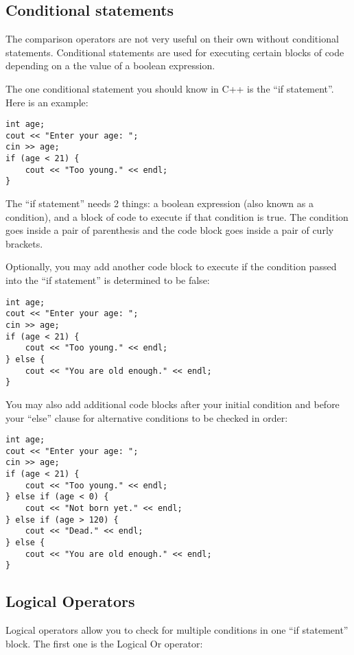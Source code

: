 \documentclass[a4paper,12pt]{article}
\begin{document}
\subsection*{Conditional statements}

The comparison operators are not very useful on their own without conditional statements. Conditional statements are used for executing certain blocks of code depending on a the value of a boolean expression.

The one conditional statement you should know in C++ is the ``if statement''. Here is an example:

\newpage

\begin{lstlisting}
int age;
cout << "Enter your age: ";
cin >> age;
if (age < 21) {
	cout << "Too young." << endl;
}
\end{lstlisting}

The ``if statement'' needs 2 things: a boolean expression (also known as a condition), and a block of code to execute if that condition is true. The condition goes inside a pair of parenthesis and the code block goes inside a pair of curly brackets.

Optionally, you may add another code block to execute if the condition passed into the ``if statement'' is determined to be false:

\begin{lstlisting}
int age;
cout << "Enter your age: ";
cin >> age;
if (age < 21) {
	cout << "Too young." << endl;
} else {
	cout << "You are old enough." << endl;
}
\end{lstlisting}

You may also add additional code blocks after your initial condition and before your ``else'' clause for alternative conditions to be checked in order:

\begin{lstlisting}
int age;
cout << "Enter your age: ";
cin >> age;
if (age < 21) {
	cout << "Too young." << endl;
} else if (age < 0) {
	cout << "Not born yet." << endl;
} else if (age > 120) {
	cout << "Dead." << endl;
} else {
	cout << "You are old enough." << endl;
}
\end{lstlisting}

\subsection*{Logical Operators}

Logical operators allow you to check for multiple conditions in one ``if statement'' block. The first one is the Logical Or operator:
\end{document}

